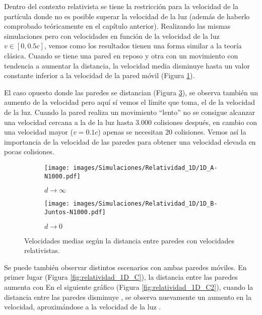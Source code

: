 Dentro del contexto relativista se tiene la restricción para la velocidad de la partícula donde no es posible superar la velocidad de la luz (además de haberlo comprobado teóricamente en el capítulo anterior). Realizando las mismas simulaciones pero con velocidades en función de la velocidad de la luz \( v \in [0, 0.5c] \), vemos como los resultados tienen una forma similar a la teoría clásica. Cuando se tiene una pared en reposo y otra con un movimiento con tendencia a aumentar la distancia, la velocidad media disminuye hasta un valor constante inferior a la velocidad de la pared móvil (Figura \ref{fig:relatividad_1D_A}). 

\vspace{3mm}

El caso opuesto donde las paredes se distancian (Figura \ref{fig:relatividad_1D_B}), se observa también un aumento de la velocidad pero aquí sí vemos el límite que toma, el de la velocidad de la luz. Cuando la pared realiza un movimiento ``lento'' no se consigue alcanzar una velocidad cercana a la de la luz hasta 3.000 colisiones después, en cambio con una velocidad mayor (\(v = 0.1c\)) apenas se necesitan 20 colisiones. Vemos así la importancia de la velocidad de las paredes para obtener una velocidad elevada en pocas colisiones.

\vspace{3mm}

\begin{figure}[H]
    \begin{subfigure}[b]{0.5\textwidth}
        \centering
        \texttt{[image: images/Simulaciones/Relatividad\_1D/1D\_A-N1000.pdf]}
        \caption{$d \rightarrow \infty$}
        \label{fig:relatividad_1D_A}
    \end{subfigure}
    \hfill
    \begin{subfigure}[b]{0.5\textwidth}
        \centering
        \texttt{[image: images/Simulaciones/Relatividad\_1D/1D\_B-Juntos-N1000.pdf]}
        \caption{$d \rightarrow 0$}
        \label{fig:relatividad_1D_B}
    \end{subfigure}
    \caption{Velocidades medias según la distancia entre paredes con velocidades relativistas.}
\end{figure}

Se puede también observar distintos escenarios con ambas paredes móviles. En primer lugar (Figura \ref{fig:relatividad_1D_C}), la distancia entre las paredes aumenta con  En el siguiente gráfico (Figura \ref{fig:relatividad_1D_C2}), cuando la distancia entre las paredes disminuye , se observa nuevamente un aumento en la velocidad, aproximándose a la velocidad de la luz . 


